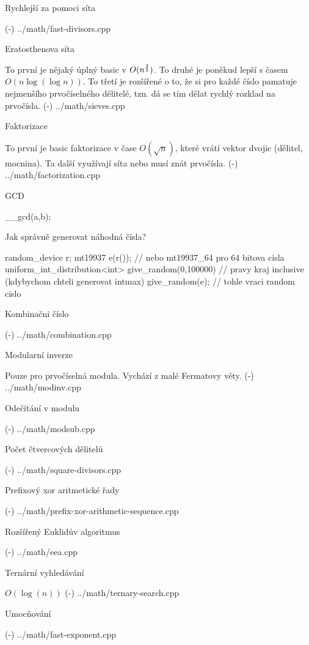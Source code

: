 \secc Rychlejší za pomoci síta 

\verbinput (-) ../math/fast-divisors.cpp

\sec Eratosthenova síta 

To první je nějaký úplný basic v $O(n^{3 \over 2})$. To druhé je poněkud lepší s časem $O(n\log(\log n))$. To třetí je rozšířené o to, že si pro každé číslo pamatuje nejmenšího prvočíselného dělitelé, tzn. dá se tím dělat rychlý rozklad na prvočísla.
\verbinput (-) ../math/sieves.cpp

\sec Faktorizace 

To první je basic faktorizace v čase $O(\sqrt n)$, které vrátí vektor dvojic (dělitel, mocnina). Ta další využívají síta nebo musí znát prvočísla.
\verbinput (-) ../math/factorization.cpp

\sec GCD 

\begtt
__gcd(a,b);
\endtt

\sec Jak správně generovat náhodná čísla? 

\begtt
  random_device r;
  mt19937 e(r()); // nebo mt19937_64 pro 64 bitova cisla
  uniform_int_distribution<int> give_random(0,100000) // pravy kraj inclusive (kdybychom chteli generovat intmax)
  give_random(e); // tohle vraci random cislo
\endtt

\sec Kombinačni číslo 

\verbinput (-) ../math/combination.cpp

\sec Modularní inverze 

Pouze pro prvočíselná modula. Vychází z malé Fermatovy věty.
\verbinput (-) ../math/modinv.cpp

\sec Odečítání v modulu 

\verbinput (-) ../math/modsub.cpp

\sec Počet čtvercových dělitelů 

\verbinput (-) ../math/square-divisors.cpp

\sec Prefixový xor aritmetické řady 

\verbinput (-) ../math/prefix-xor-arithmetic-sequence.cpp

\sec Rozšířený Euklidův algoritmus 

\verbinput (-) ../math/eea.cpp

\sec Ternární vyhledávání 

$O(\log(n))$
\verbinput (-) ../math/ternary-search.cpp

\sec Umocňování 

\verbinput (-) ../math/fast-exponent.cpp

